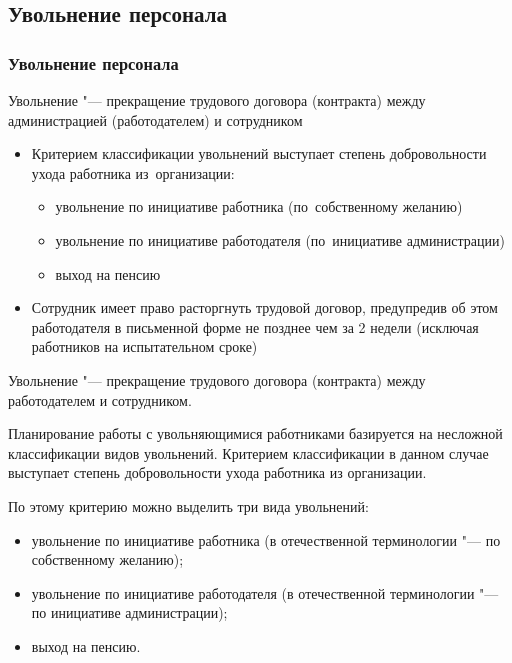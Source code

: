 \documentclass{../industrial-development}
\begin{document}
\subsection{Увольнение персонала}
\begin{frame} \frametitle{Увольнение персонала}
	
	\alert{Увольнение} "--- прекращение трудового договора (контракта) между администрацией (работодателем) и сотрудником 
	
	\begin{itemize}
		\item Критерием классификации увольнений выступает степень добровольности ухода работника из~организации:
		\begin{itemize}
			\item увольнение по инициативе работника (по~собственному желанию)
			\item увольнение по инициативе работодателя (по~инициативе администрации)
			\item выход на пенсию
		\end{itemize}
		\item Сотрудник имеет право расторгнуть трудовой договор, предупредив об этом работодателя в письменной форме не позднее чем за 2 недели (исключая работников на испытательном сроке)
		
	\end{itemize}
	
\end{frame}

\lecturenotes

Увольнение "--- прекращение трудового договора (контракта) между работодателем и сотрудником.

Планирование работы с увольняющимися работниками базируется на несложной классификации видов увольнений. Критерием классификации в данном случае выступает степень добровольности ухода работника из организации.

По этому критерию можно выделить три вида увольнений:
\begin{itemize}
	\item увольнение по инициативе работника (в отечественной терминологии "--- по собственному желанию);
	\item увольнение по инициативе работодателя (в отечественной терминологии "--- по инициативе администрации);
	\item выход на пенсию.
\end{itemize}
\end{document}
